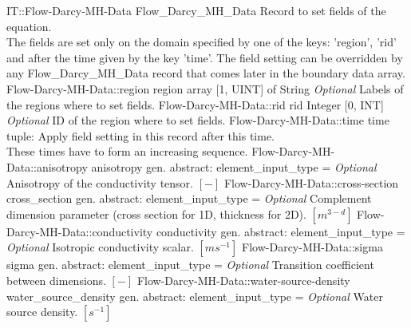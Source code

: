 \begin{RecordType}
	{IT::Flow-Darcy-MH-Data}
	{Flow{\_}Darcy{\_}MH{\_}Data}
	{}%
	{}%
	{{{Record to set fields of the equation.}\\{
The fields are set only on the domain specified by one of the keys: 'region', 'rid'}\\{
and after the time given by the key 'time'. The field setting can be overridden by}\\{
 any Flow{\_}Darcy{\_}MH{\_}Data record that comes later in the boundary data array.}%
}}
		\RecKey
			{Flow-Darcy-MH-Data::region}
			{region}
			{{array [1, UINT] of }{String}}{}
			{ \it{Optional}}
			{{{Labels of the regions where to set fields. }%
}}
		\RecKey
			{Flow-Darcy-MH-Data::rid}
			{rid}
			{{Integer [0, INT]}}{}
			{ \it{Optional}}
			{{{ID of the region where to set fields.}%
}}
		\RecKey
			{Flow-Darcy-MH-Data::time}
			{time}
			{{tuple: }}{}
			{ }
			{{{Apply field setting in this record after this time.}\\{
These times have to form an increasing sequence.}%
}}
		\RecKey
			{Flow-Darcy-MH-Data::anisotropy}
			{anisotropy}
			{{gen. abstract: }}{{element{\_}input{\_}type}{ = }}
			{ \it{Optional}}
			{{{Anisotropy of the conductivity tensor. }{$[-]$}%
}}
		\RecKey
			{Flow-Darcy-MH-Data::cross-section}
			{cross{\_}section}
			{{gen. abstract: }}{{element{\_}input{\_}type}{ = }}
			{ \it{Optional}}
			{{{Complement dimension parameter (cross section for 1D, thickness for 2D). }{$[m^{3-d}]$}%
}}
		\RecKey
			{Flow-Darcy-MH-Data::conductivity}
			{conductivity}
			{{gen. abstract: }}{{element{\_}input{\_}type}{ = }}
			{ \it{Optional}}
			{{{Isotropic conductivity scalar. }{$[ms^{-1}]$}%
}}
		\RecKey
			{Flow-Darcy-MH-Data::sigma}
			{sigma}
			{{gen. abstract: }}{{element{\_}input{\_}type}{ = }}
			{ \it{Optional}}
			{{{Transition coefficient between dimensions. }{$[-]$}%
}}
		\RecKey
			{Flow-Darcy-MH-Data::water-source-density}
			{water{\_}source{\_}density}
			{{gen. abstract: }}{{element{\_}input{\_}type}{ = }}
			{ \it{Optional}}
			{{{Water source density. }{$[s^{-1}]$}%
}}
\end{RecordType}

